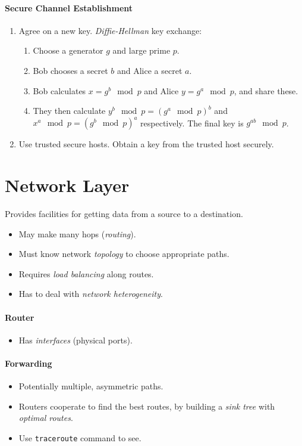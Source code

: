 \documentclass[twocolumn,english]{article}
\begin{document}
\paragraph{Secure Channel Establishment}
\begin{enumerate}
\item Agree on a new key. \emph{Diffie-Hellman} key exchange:
\begin{enumerate}
\item Choose a generator $g$ and large prime $p$.
\item Bob chooses a secret $b$ and Alice a secret $a$.
\item Bob calculates $x=g^{b}\mod p$ and Alice $y=g^{a}\mod p$, and share
these.
\item They then calculate $y^{b}\mod p=\left(g^{a}\mod p\right)^{b}$ and
$x^{a}\mod p=\left(g^{b}\mod p\right)^{a}$ respectively. The final
key is $g^{ab}\mod p$.
\end{enumerate}
\item Use trusted secure hosts. Obtain a key from the trusted host securely.
\end{enumerate}

\section{Network Layer}

Provides facilities for getting data from a source to a destination.
\begin{itemize}
\item May make many hops (\emph{routing}).
\item Must know network \emph{topology} to choose appropriate paths.
\item Requires \emph{load balancing} along routes.
\item Has to deal with \emph{network heterogeneity}.
\end{itemize}

\paragraph{Router}
\begin{itemize}
\item Has \emph{interfaces} (physical ports).
\end{itemize}

\paragraph{Forwarding}
\begin{itemize}
\item Potentially multiple, asymmetric paths.
\item Routers cooperate to find the best routes, by building a \emph{sink
tree} with \emph{optimal routes}.
\item Use \texttt{traceroute} command to see.
\end{itemize}
\end{document}
